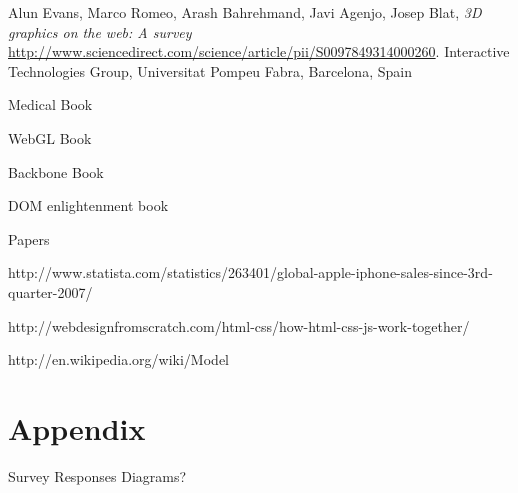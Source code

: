 \documentclass[a4paper,11pt,twoside]{article}
\begin{document}
\begin{thebibliography}{1}
     Alun Evans, Marco Romeo, Arash Bahrehmand, Javi Agenjo, Josep Blat, {\em 3D graphics on the web: A survey } \url{http://www.sciencedirect.com/science/article/pii/S0097849314000260}. Interactive Technologies Group, Universitat Pompeu Fabra, Barcelona, Spain


Medical Book


WebGL Book

Backbone Book

DOM enlightenment book


Papers


http://www.statista.com/statistics/263401/global-apple-iphone-sales-since-3rd-quarter-2007/

http://webdesignfromscratch.com/html-css/how-html-css-js-work-together/

http://en.wikipedia.org/wiki/Model%

\end{thebibliography}






\newpage

\section{Appendix}

Survey Responses
Diagrams?
\end{document}
